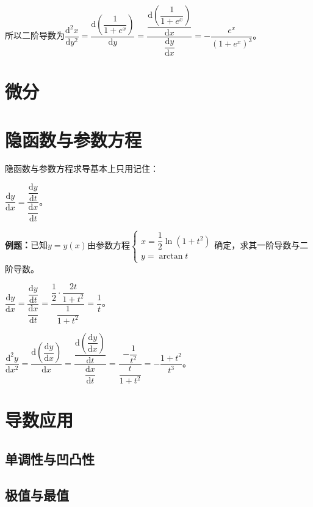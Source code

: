 所以二阶导数为$\dfrac{\textrm{d}^2x}{\textrm{d}y^2}=\dfrac{\textrm{d}\left(\dfrac{1}{1+e^{x}}\right)}{\textrm{d}y}=\dfrac{\dfrac{\textrm{d}\left(\dfrac{1}{1+e^{x}}\right)}{\textrm{d}x}}{\dfrac{\textrm{d}y}{\textrm{d}x}}=-\dfrac{e^x}{(1+e^x)^3}$。


\section{微分}


\section{隐函数与参数方程}

隐函数与参数方程求导基本上只用记住：\medskip

$\dfrac{\textrm{d}y}{\textrm{d}x}=\dfrac{\dfrac{\textrm{d}y}{\textrm{d}t}}{\dfrac{\textrm{d}x}{\textrm{d}t}}$。

\textbf{例题：}已知$y=y(x)$由参数方程$\left\{\begin{array}{lcl}
                                       x=\dfrac{1}{2}\ln(1+t^2) \\
                                       y=\arctan t
\end{array}
\right.$确定，求其一阶导数与二阶导数。

$\dfrac{\textrm{d}y}{\textrm{d}x}=\dfrac{\dfrac{\textrm{d}y}{\textrm{d}t}}{\dfrac{\textrm{d}x}{\textrm{d}t}}=\dfrac{\dfrac{1}{2}\cdot\dfrac{2t}{1+t^2}}{\dfrac{1}{1+t^2}}=\dfrac{1}{t}$。

$\dfrac{\textrm{d}^2y}{\textrm{d}x^2}=\dfrac{\textrm{d}\left(\dfrac{\textrm{d}y}{\textrm{d}x}\right)}{\textrm{d}x}=\dfrac{\dfrac{\textrm{d}\left(\dfrac{\textrm{d}y}{\textrm{d}x}\right)}{\textrm{d}t}}{\dfrac{\textrm{d}x}{\textrm{d}t}}=\dfrac{-\dfrac{1}{t^2}}{\dfrac{t}{1+t^2}}=-\dfrac{1+t^2}{t^3}$。


\section{导数应用}

\subsection{单调性与凹凸性}

\subsection{极值与最值}

